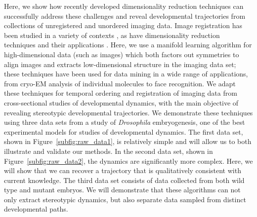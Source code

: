 \documentclass{pnastwo}
\begin{document}
\begin{article}
Here, we show how recently developed dimensionality reduction techniques can successfully address these challenges and reveal developmental trajectories from collections of unregistered and unordered imaging data. 
%
Image registration has been studied in a variety of contexts \cite{zitova2003image, rowley1998rotation, hajnal2010medical, greenspan1994rotation, zhao2003face}, as have dimensionality reduction techniques \cite{Belkin2003, coifman2005geometric, coifman2006geometric, tenenbaum2000global, roweis2000nonlinear} and their applications \cite{anavy2014blind, trapnell2014dynamics,gupta2008extracting, qiu2011discovering, kafri2013dynamics}.
%
Here, we use a manifold learning algorithm \cite{singer2012vector} for high-dimensional data (such as images) which both factors out symmetries to align images and extracts low-dimensional structure in the imaging data set; these techniques have been used for data mining in a wide range of applications, from cryo-EM analysis of individual molecules to face recognition. 
%
We adapt these techniques for temporal ordering and registration of imaging data from cross-sectional studies of developmental dynamics, with the main objective of revealing stereotypic developmental trajectories.
%
We demonstrate these techniques using three data sets from a study of {\it Drosophila} embryogenesis, one of the best experimental models for studies of developmental dynamics.
%
The first data set, shown in Figure~\ref{subfig:raw_data1}, is relatively simple and will allow us to both illustrate and validate our methods. 
%
In the second data set, shown in Figure~\ref{subfig:raw_data2}, the dynamics are significantly more complex.
%
Here, we will show that we can recover a trajectory that is qualitatively consistent with current knowledge.
%
The third data set consists of data collected from both wild type and mutant embryos.
%
We will demonstrate that these algorithms can not only extract stereotypic dynamics, but also separate data sampled from distinct developmental paths.

%
%
%
%



\end{article}
\end{document}

